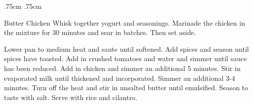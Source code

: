 \documentclass[]{article}
\title{}
\author{}
\begin{document}
\RecipeWidths{\textwidth}{3cm}{0.5cm}{5cm} {.75cm} {.75cm}
\begin{recipe}{Butter Chicken}{}{}	
	Whisk together yogurt and seasonings. Marinade the chicken in the mixture for 30 minutes and sear in batches. Then set aside. 
	
	Lower pan to medium heat and saute until softened. 
	Add spices and season until spices have toasted.
	Add in crushed tomatoes and water and simmer until sauce has been reduced. Add in chicken and simmer an additional 5 minutes.
	Stir in evaporated milk until thickened and incorporated. Simmer an additional 3-4 minutes.
	Turn off the heat and stir in unsalted butter until emulsified. Season to taste with salt. Serve with rice and cilantro.
\end{recipe}
\end{document}

